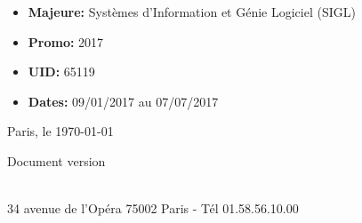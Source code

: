 \pagestyle{fancy}
\thispagestyle{empty}

\begin{spacing}{1.5}
    \center
    {\fontsize{16}{18}\selectfont {}}
\end{spacing}

\vspace{1 cm}
\noindent\begin{minipage}[t]{6cm}
    \begin{itemize}[label=, leftmargin=*, itemsep=0pt]
        \item \textbf{Majeure:} Systèmes d'Information et Génie Logiciel (SIGL)
        \item \textbf{Promo:} 2017
        \item \textbf{UID:} 65119
        \item \textbf{Dates:} 09/01/2017 au 07/07/2017
    \end{itemize}
\end{minipage}
\hfill
\begin{minipage}[t]{5.4cm}
    \begin{flushleft}
        \begin{spacing}{1.8}
            Paris, le \today\\
        \end{spacing}
    \end{flushleft}
\end{minipage}

\vspace{1cm}

\begin{flushright}
    {\Huge \title\\}
    \hrulefill \\ \vspace{0.5 cm}
    {\LARGE \subtitle}
\end{flushright}
\vspace{1.5 cm}

\begin{center}
    \vspace{0.5 cm}

    \vspace{4.5cm}

    \begin{small}
        Document version \version{}
    \end{small} \\
    {\scriptsize 34 avenue de l'Opéra 75002 Paris - Tél 01.58.56.10.00}
\end{center}

